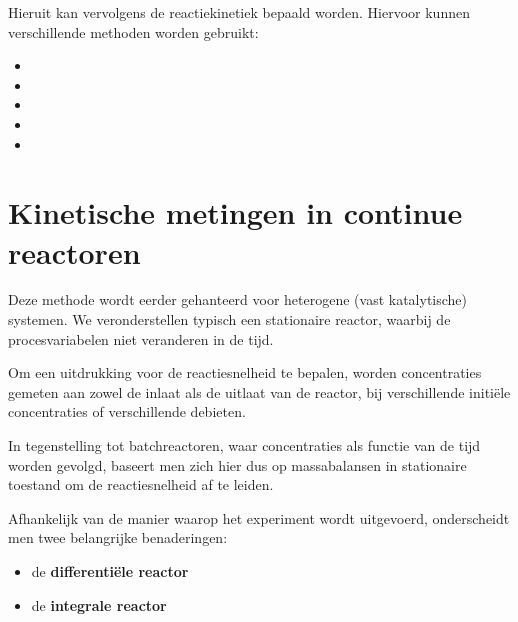 \documentclass{ximera}
\begin{document}
Hieruit kan vervolgens de reactiekinetiek bepaald worden. Hiervoor kunnen verschillende methoden worden gebruikt:
\begin{itemize}
    \item {}
    \item {}
    \item {}
    \item {}
    \item {} 
\end{itemize}

\section*{Kinetische metingen in continue reactoren}

Deze methode wordt eerder gehanteerd voor heterogene (vast katalytische) systemen. We veronderstellen typisch een stationaire  reactor, waarbij de procesvariabelen niet veranderen in de tijd.

Om een uitdrukking voor de reactiesnelheid te bepalen, worden concentraties gemeten aan zowel de inlaat als de uitlaat van de reactor, bij verschillende initiële concentraties of verschillende debieten.

In tegenstelling tot batchreactoren, waar concentraties als functie van de tijd worden gevolgd, baseert men zich hier dus op massabalansen in stationaire toestand om de reactiesnelheid af te leiden.

\vspace{0.3cm}

Afhankelijk van de manier waarop het experiment wordt uitgevoerd, onderscheidt men twee belangrijke benaderingen:

\begin{itemize}
    \item de \textbf{differentiële reactor}
    \item de \textbf{integrale reactor}
\end{itemize}
\end{document}
